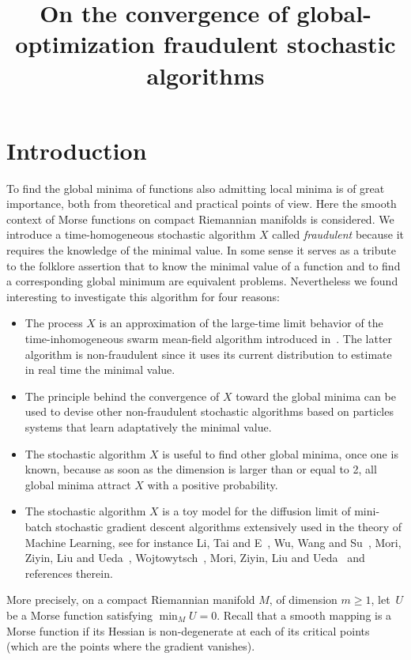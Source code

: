\documentclass[AHL,Unicode,longabstracts,published]{cedram}
\title[Fraudulent algorithms]{On the convergence of global-optimization fraudulent stochastic algorithms}
\author[\initial{L.} \lastname{Miclo}]{\firstname{Laurent} \lastname{Miclo}}
\begin{document}
\maketitle

\section{Introduction}

To find the global minima of functions also admitting local minima is of great importance, both from theoretical and practical points of view. Here the smooth context of Morse functions on compact Riemannian manifolds is considered. We introduce a time-homogeneous stochastic algorithm $X$ called \emph{fraudulent} because it requires the knowledge of the minimal value. In some sense it serves as a tribute to the folklore assertion that to know the minimal value of a function and to find a corresponding global minimum are equivalent problems. Nevertheless we found interesting to investigate this algorithm for four reasons:
\begin{itemize}
\item The process $X$ is an approximation of the large-time limit behavior of the time-inhomogeneous swarm mean-field algorithm introduced in~\cite{https://doi.org/10.48550/arxiv.2204.01306}. The latter algorithm is non-fraudulent since it uses its current distribution to estimate in real time the minimal value.
\item The principle behind the convergence of $X$ toward the global minima can be used to devise other non-fraudulent stochastic algorithms based on particles systems that learn adaptatively the minimal value.
\item The stochastic algorithm $X$ is useful to find other global minima, once one is known, because as soon as the dimension is larger than or equal to 2, all global minima attract $X$ with a positive probability.
\item The stochastic algorithm $X$ is a toy model for the diffusion limit of mini-batch stochastic gradient descent algorithms extensively used in the theory of Machine Learning, see for instance Li, Tai and E~\cite{zbMATH07049759}, Wu, Wang and Su~\cite{wu2022the}, Mori, Ziyin, Liu and Ueda~\cite{pmlr-v162-mori22a}, Wojtowytsch~\cite{wojtowytsch2021stochastic}, Mori, Ziyin, Liu and Ueda~\cite{pmlr-v162-mori22a} and references therein.
\end{itemize}


 More precisely, on a compact Riemannian manifold $M$, of dimension $m\geq 1$, let~$U$ be a Morse function satisfying $\min_MU=0$. Recall that a smooth mapping is a Morse function if its Hessian is non-degenerate at each of its critical points (which are the points where the gradient vanishes).
\end{document}
